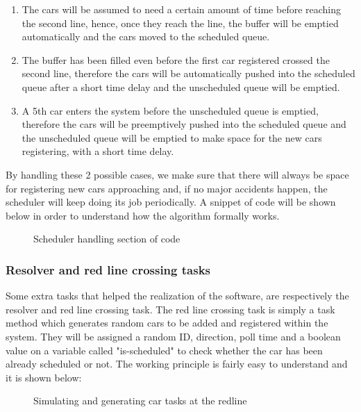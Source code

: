 \documentclass[conference]{IEEEtran}
\begin{document}
\begin{enumerate}
\item The cars will be assumed to need a certain amount of time before reaching the second line, hence, once they reach the line, the buffer will be emptied automatically and the cars moved to the scheduled queue.

\item The buffer has been filled even before the first car registered crossed the second line, therefore the cars will be automatically pushed into the scheduled queue after a short time delay and the unscheduled queue will be emptied.

\item A 5th car enters the system before the unscheduled queue is emptied, therefore the cars will be preemptively pushed into the scheduled queue and the unscheduled queue will be emptied to make space for the new cars registering, with a short time delay.
\end{enumerate}

By handling these 2 possible cases, we make sure that there will always be space for registering new cars approaching and, if no major accidents happen, the scheduler will keep doing its job periodically.
A snippet of code will be shown below in order to understand how the algorithm formally works.
\begin{figure}[h]
    \caption{Scheduler handling section of code}
    \label{scheduler}
\end{figure}

\subsubsection{Resolver and red line crossing tasks}
Some extra tasks that helped the realization of the software, are respectively the resolver and red line crossing task. The red line crossing task is simply a task method which generates random cars to be added and registered within the system. They will be assigned a random ID, direction, poll time and a boolean value on a variable called "is-scheduled" to check whether the car has been already scheduled or not. The working principle is fairly easy to understand and it is shown below:
\begin{figure}[h]
    \caption{Simulating and generating car tasks at the redline}
    \label{redline}
\end{figure}
\end{document}
